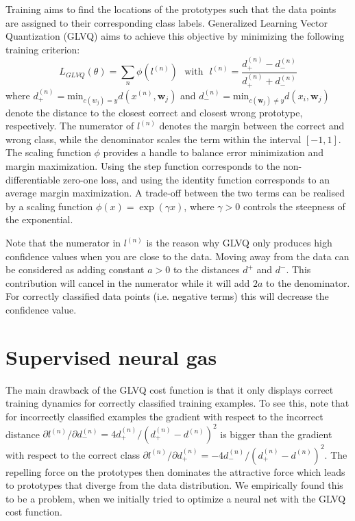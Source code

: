 \documentclass{esannV2}
\begin{document}
Training aims to find the locations of the prototypes such that the data points are assigned to their corresponding class labels. Generalized Learning Vector Quantization (GLVQ) \cite{sato1996generalized} aims to achieve this objective by minimizing the following training criterion:
\begin{equation}
 L_{GLVQ}(\theta) = \sum_n \phi(l^{(n)}) \mbox{~~with~~} l^{(n)} = \frac{d^{(n)}_+ - d^{(n)}_-}{d^{(n)}_+ + d^{(n)}_-}
\end{equation}
where $d^{(n)}_+ = \mbox{min}_{c(w_j) = y} d(x^{(n)}, \mathbf{w}_j)$ and $d^{(n)}_- = \mbox{min}_{c(\mathbf{w}_j)\neq y} d(x_i, \mathbf{w}_j)$ denote the distance to the closest correct and closest wrong prototype, respectively. The numerator of $l^{(n)}$ denotes the margin between the correct and wrong class, while the denominator scales the term within the interval $[-1, 1]$. The scaling function $\phi$ provides a handle to balance error minimization and margin maximization. Using the step function corresponds to the non-differentiable zero-one loss, and using the identity function corresponds to an average margin maximization. A trade-off between the two terms can be realised by a scaling function $\phi(x) = \exp(\gamma x)$, where $\gamma > 0$ controls the steepness of the exponential. 

Note that the numerator in $l^{(n)}$ is the reason why GLVQ only produces high confidence values when you are close to the data. Moving away from the data can be considered as adding constant $a > 0$ to the distances $d^+$ and $d^-$. This contribution will cancel in the numerator while it will add $2a$ to the denominator. For correctly classified data points (i.e. negative terms) this will decrease the confidence value.

\section{Supervised neural gas}
The main drawback of the GLVQ cost function is that it only displays correct training dynamics for correctly classified training examples\cite{sato1996generalized}.  To see this, note that for incorrectly classified examples the gradient with respect to the incorrect distance $\partial l^{(n)} / \partial d^{(n)}_- = 4d^{(n)}_+/(d^{(n)}_+ - d^{(n)})^2$ is bigger than the gradient with respect to the correct class $\partial l^{(n)} / \partial d^{(n)}_+ = -4d^{(n)}_-/(d^{(n)}_+ - d^{(n)})^2$. The repelling force on the prototypes then dominates the attractive force which leads to prototypes that diverge from the data distribution. We empirically found this to be a problem, when we initially tried to optimize a neural net with the GLVQ cost function. 
\end{document}
